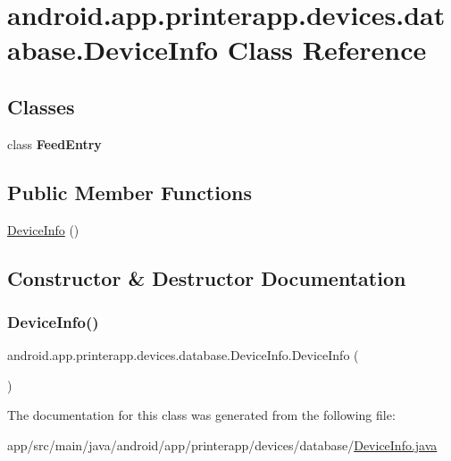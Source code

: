\hypertarget{classandroid_1_1app_1_1printerapp_1_1devices_1_1database_1_1_device_info}{}\section{android.\+app.\+printerapp.\+devices.\+database.\+Device\+Info Class Reference}
\label{classandroid_1_1app_1_1printerapp_1_1devices_1_1database_1_1_device_info}
\subsection*{Classes}
\begin{DoxyCompactItemize}
\item 
class {\bfseries Feed\+Entry}
\end{DoxyCompactItemize}
\subsection*{Public Member Functions}
\begin{DoxyCompactItemize}
\item 
\hyperlink{classandroid_1_1app_1_1printerapp_1_1devices_1_1database_1_1_device_info_aa1440962986e63bba97018e23346bd04}{Device\+Info} ()
\end{DoxyCompactItemize}


\subsection{Constructor \& Destructor Documentation}
\mbox{\label{classandroid_1_1app_1_1printerapp_1_1devices_1_1database_1_1_device_info_aa1440962986e63bba97018e23346bd04}} 
\subsubsection{\texorpdfstring{Device\+Info()}{DeviceInfo()}}
{\footnotesize\ttfamily android.\+app.\+printerapp.\+devices.\+database.\+Device\+Info.\+Device\+Info (\begin{DoxyParamCaption}{ }\end{DoxyParamCaption})}



The documentation for this class was generated from the following file\+:\begin{DoxyCompactItemize}
\item 
app/src/main/java/android/app/printerapp/devices/database/\hyperlink{_device_info_8java}{Device\+Info.\+java}\end{DoxyCompactItemize}
